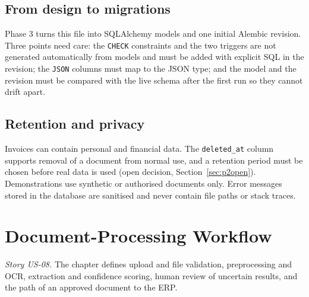 \documentclass[11pt,a4paper]{report}
\begin{document}
\section{From design to migrations}
Phase 3 turns this file into SQLAlchemy models and one initial Alembic revision. Three points need care: the \texttt{CHECK} constraints and the two triggers are not generated automatically from models and must be added with explicit SQL in the revision; the \texttt{JSON} columns must map to the JSON type; and the model and the revision must be compared with the live schema after the first run so they cannot drift apart.

\section{Retention and privacy}
Invoices can contain personal and financial data. The \texttt{deleted\_at} column supports removal of a document from normal use, and a retention period must be chosen before real data is used (open decision, Section~\ref{sec:p2open}). Demonstrations use synthetic or authorised documents only. Error messages stored in the database are sanitised and never contain file paths or stack traces.

\chapter{Document-Processing Workflow}\label{ch:p2flow}
\emph{Story US-08.} The chapter defines upload and file validation, preprocessing and OCR, extraction and confidence scoring, human review of uncertain results, and the path of an approved document to the ERP.
\end{document}
